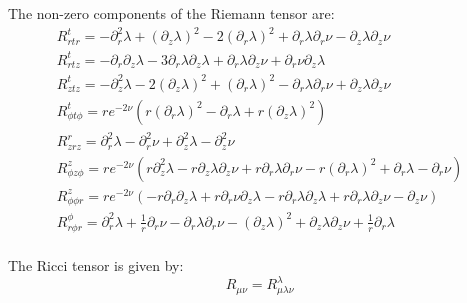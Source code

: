 \documentclass{article}
\begin{document}
The non-zero components of the Riemann tensor are:
\begin{equation}
\begin{array}{l}
R^{t}_{rtr}=-\partial^{2}_{r}\lambda+\left(\partial_{z}\lambda\right)^{2}-2\left(\partial_{r}\lambda\right)^{2}+\partial_{r}\lambda\partial_{r}\nu-\partial_{z}\lambda\partial_{z}\nu\\
R^{t}_{rtz}=-\partial_{r}\partial_{z}\lambda-3\partial_{r}\lambda\partial_{z}\lambda+\partial_{r}\lambda\partial_{z}\nu+\partial_{r}\nu\partial_{z}\lambda\\
R^{t}_{ztz}=-\partial^{2}_{z}\lambda-2\left(\partial_{z}\lambda\right)^{2}+\left(\partial_{r}\lambda\right)^{2}-\partial_{r}\lambda\partial_{r}\nu+\partial_{z}\lambda\partial_{z}\nu\\
R^{t}_{\phi t\phi}=re^{-2\nu}\left(r\left(\partial_{r}\lambda\right)^{2}-\partial_{r}\lambda+r\left(\partial_{z}\lambda\right)^{2}\right)\\
R^{r}_{zrz}=\partial^{2}_{r}\lambda-\partial^{2}_{r}\nu+\partial^{2}_{z}\lambda-\partial^{2}_{z}\nu\\
R^{z}_{\phi z\phi}=re^{-2\nu}\left(r\partial^{2}_{z}\lambda-r\partial_{z}\lambda\partial_{z}\nu+r\partial_{r}\lambda\partial_{r}\nu-r\left(\partial_{r}\lambda\right)^{2}+\partial_{r}\lambda-\partial_{r}\nu\right)\\
R^{z}_{\phi\phi r}=re^{-2\nu}\left(-r\partial_{r}\partial_{z}\lambda+r\partial_{r}\nu\partial_{z}\lambda-r\partial_{r}\lambda\partial_{z}\lambda+r\partial_{r}\lambda\partial_{z}\nu-\partial_{z}\nu\right)\\
R^{\phi}_{r\phi r}=\partial^{2}_{r}\lambda+\frac{1}{r}\partial_{r}\nu-\partial_{r}\lambda\partial_{r}\nu-\left(\partial_{z}\lambda\right)^{2}+\partial_{z}\lambda\partial_{z}\nu+\frac{1}{r}\partial_{r}\lambda\\
\end{array}
\end{equation}

The Ricci tensor is given by:
\begin{equation}
R_{\mu\nu}=R_{\mu\lambda\nu}^{\lambda}
\end{equation}
\end{document}
